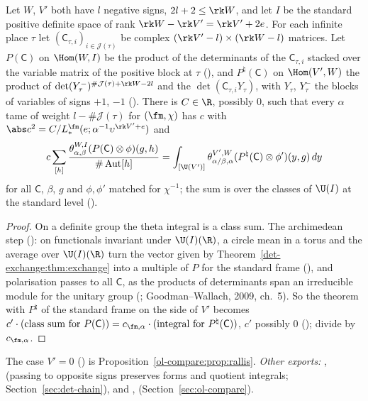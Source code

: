 \begin{theorem}
\label{det-exchange:thm:explicit}
Let $W$, $V'$ both have $l$ negative signs, $2l+2\le\rk W$, and let $I$ be the standard positive
definite space of rank $\rk W-\rk V'=\rk V'+2e$. For each infinite place $\tau$ let
$(\mathsf C_{\tau,i})_{i\in\mathcal J(\tau)}$ be complex $(\rk V'-l)\times(\rk W-l)$ matrices. Let
$P(\mathsf C)$ on $\Hom(W,I)$ be the product of the determinants of the $\mathsf C_{\tau,i}$ stacked over the
variable matrix of the positive block at $\tau$ (), and $P^\natural(\mathsf C)$ on
$\Hom(V',W)$ the product of $\det(Y_\tau^-)^{\#\mathcal J(\tau)+\rk W-2l}$ and the
$\det(\mathsf C_{\tau,i}Y_\tau)$, with $Y_\tau$, $Y_\tau^-$ the blocks of variables of signs $+1$, $-1$
(). There is $C\in\R$, possibly $0$, such that every $\alpha$ tame of
weight $l-\#\mathcal J(\tau)$ for $(\fm,\chi)$ has $c$ with
$\abs c^2=C/L_*^{\fm}(e;\alpha^{-1}\upsilon^{\rk V'+e})$ and
\[
  c\sum_{[h]}\frac{\theta^{W,I}_{\alpha,\beta}(P(\mathsf C)\otimes\phi)(g,h)}{\#\operatorname{Aut}[h]}
  =\int_{[\U(V')]}\theta^{V',W}_{\alpha/\beta,\alpha}(P^\natural(\mathsf C)\otimes\phi')(y,g)\,dy
\]
for all $\mathsf C$, $\beta$, $g$ and $\phi,\phi'$ matched for $\chi^{-1}$; the sum is over the classes of
$\U(I)$ at the standard level ().
\end{theorem}

\begin{proof}
On a definite group the theta integral is a class sum. The archimedean step
(): on functionals invariant under
$\U(I)(\R)$, a circle mean in a torus and the average over $\U(I)(\R)$ turn the vector given by
Theorem~\ref{det-exchange:thm:exchange} into a multiple of $P$ for the standard frame
(), and polarisation passes to all $\mathsf C$, as the products
of determinants span an irreducible module for the unitary group
(; Goodman--Wallach, 2009, ch.~5). So the theorem with $P^\natural$ of
the standard frame on the side of $V'$ becomes $c'\cdot(\text{class sum for }P(\mathsf C))=c_{\fm,\alpha}
\cdot(\text{integral for }P^\natural(\mathsf C))$, $c'$ possibly $0$
(); divide by $c_{\fm,\alpha}$.
\end{proof}

The case $V'=0$ () is
Proposition~\ref{ol-compare:prop:rallis}. \emph{Other exports:}
, 
(passing to opposite signs preserves forms and quotient integrals; Section~\ref{sec:det-chain}), and
, 
(Section~\ref{sec:ol-compare}).

